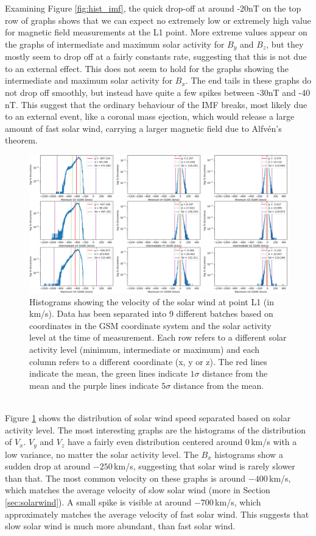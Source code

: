 \documentclass[12pt]{article}
\begin{document}
        Examining Figure \ref{fig:hist_imf}, the quick drop-off at around -20nT on the top row of graphs shows that we can expect no extremely low or extremely high value for magnetic field measurements at the L1 point. More extreme values appear on the graphs of intermediate and maximum solar activity for $B_y$ and $B_z$, but they mostly seem to drop off at a fairly constants rate, suggesting that this is not due to an external effect. This does not seem to hold for the graphs showing the intermediate and maximum solar activity for $B_x$. The end tails in these graphs do not drop off smoothly, but instead have quite a few spikes between -30nT and -40 nT. This suggest that the ordinary behaviour of the IMF breaks, most likely due to an external event, like a coronal mass ejection, which would release a large amount of fast solar wind, carrying a larger magnetic field due to Alfvén's theorem\cite{1976alfven}.\\
        \begin{figure}[t!]
            \centering
            \includegraphics[width=\textwidth]{fig_theory/hist_sw_velocity.png}
            \caption{Histograms showing the velocity of the solar wind at point L1 (in km/s). Data has been separated into 9 different batches based on coordinates in the GSM coordinate system and the solar activity level at the time of measurement. Each row refers to a different solar activity level (minimum, intermediate or maximum) and each column refers to a different coordinate (x, y or z). The red lines indicate the mean, the green lines indicate $1\sigma$ distance from the mean and the purple lines indicate $5\sigma$ distance from the mean.}
            \label{fig:hist_sw}
        \end{figure}\\
        Figure \ref{fig:hist_sw} shows the distribution of solar wind speed separated based on solar activity level. The most interesting graphs are the histograms of the distribution of $V_x$. $V_y$ and $V_z$ have a fairly even distribution centered around $0\,$km/s with a low variance, no matter the solar activity level. The $B_x$ histograms show a sudden drop at around $-250\,$km/s, suggesting that solar wind is rarely slower than that. The most common velocity on these graphs is around $-400\,$km/s, which matches the average velocity of slow solar wind\cite{2001russell} (more in Section \ref{sec:solarwind}). A small spike is visible at around $-700\,$km/s, which approximately matches the average velocity of fast solar wind\cite{2001russell}. This suggests that slow solar wind is much more abundant, than fast solar wind.
\end{document}

